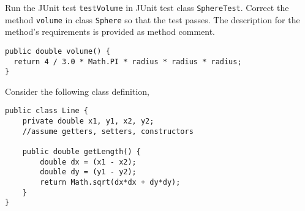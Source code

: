 \begin{questions}
%
%
%
%


Run the JUnit test \texttt{testVolume} in JUnit test class \texttt{SphereTest}. Correct the method \texttt{volume} in class \texttt{Sphere} so that the test passes. The description for the method's requirements is provided as method comment.

\begin{solution}
\begin{lstlisting}
public double volume() {
  return 4 / 3.0 * Math.PI * radius * radius * radius;
}
\end{lstlisting}
\end{solution}

 Consider the following class definition,
		
\begin{lstlisting}
public class Line {
	private double x1, y1, x2, y2;
	//assume getters, setters, constructors	
	
	public double getLength() {
		double dx = (x1 - x2);
		double dy = (y1 - y2);
		return Math.sqrt(dx*dx + dy*dy);
	}
}
\end{lstlisting}
	
\end{questions}
